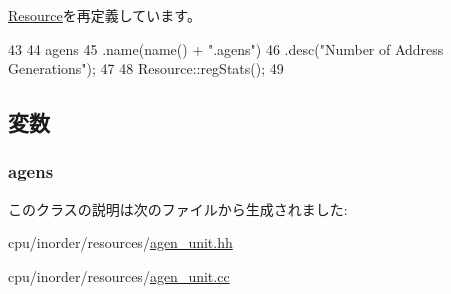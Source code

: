 \hyperlink{classResource_ac1739a9be0fbd5d96cf441cd3b2c1c78}{Resource}を再定義しています。


\begin{DoxyCode}
43 {
44     agens
45         .name(name() + ".agens")
46         .desc("Number of Address Generations");
47 
48     Resource::regStats();
49 }
\end{DoxyCode}


\subsection{変数}
\hypertarget{classAGENUnit_af050796f6e4377dc1312864abd020b87}{
\subsubsection[{agens}]{ {\bf agens}}}
\label{classAGENUnit_af050796f6e4377dc1312864abd020b87}


このクラスの説明は次のファイルから生成されました:\begin{DoxyCompactItemize}
\item 
cpu/inorder/resources/\hyperlink{agen__unit_8hh}{agen\_\-unit.hh}\item 
cpu/inorder/resources/\hyperlink{agen__unit_8cc}{agen\_\-unit.cc}\end{DoxyCompactItemize}
